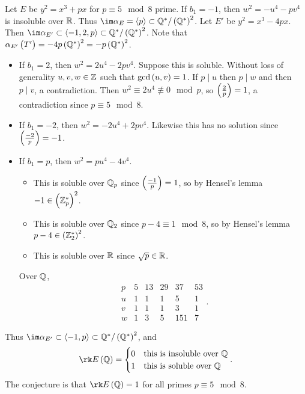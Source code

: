\begin{example*}
Let $ E $ be $ y^2 = x^3 + px $ for $ p \equiv 5 \mod 8 $ prime. If $ b_1 = -1 $, then $ w^2 = -u^4 - pv^4 $ is insoluble over $ \mathbb{R} $. Thus $ \im \alpha_E = \abr{p} \subset \QQ^* / \br{\QQ^*}^2 $. Let $ E' $ be $ y^2 = x^3 - 4px $. Then $ \im \alpha_{E'} \subset \abr{-1, 2, p} \subset \QQ^* / \br{\QQ^*}^2 $. Note that $ \alpha_{E'}\br{T'} = -4p\br{\QQ^*}^2 = -p\br{\QQ^*}^2 $.
\begin{itemize}
\item If $ b_1 = 2 $, then $ w^2 = 2u^4 - 2pv^4 $. Suppose this is soluble. Without loss of generality $ u, v, w \in \mathbb{Z} $ such that $ \gcd\br{u, v} = 1 $. If $ p \mid u $ then $ p \mid w $ and then $ p \mid v $, a contradiction. Then $ w^2 \equiv 2u^4 \not\equiv 0 \mod p $, so $ \br{\tfrac{2}{p}} = 1 $, a contradiction since $ p \equiv 5 \mod 8 $.
\item If $ b_1 = -2 $, then $ w^2 = -2u^4 + 2pv^4 $. Likewise this has no solution since $ \br{\tfrac{-2}{p}} = -1 $.
\item If $ b_1 = p $, then $ w^2 = pu^4 - 4v^4 $.
\begin{itemize}
\item This is soluble over $ \mathbb{Q}_p $ since $ \br{\tfrac{-1}{p}} = 1 $, so by Hensel's lemma $ -1 \in \br{\ZZ_p^*}^2 $.
\item This is soluble over $ \mathbb{Q}_2 $ since $ p - 4 \equiv 1 \mod 8 $, so by Hensel's lemma $ p - 4 \in \br{\ZZ_2^*}^2 $.
\item This is soluble over $ \mathbb{R} $ since $ \sqrt{p} \in \mathbb{R} $.
\end{itemize}
Over $ \mathbb{Q} $,
$$
\begin{array}{c|ccccc}
p & 5 & 13 & 29 & 37 & 53 \\
\hline
u & 1 & 1 & 1 & 5 & 1 \\
v & 1 & 1 & 1 & 3 & 1 \\
w & 1 & 3 & 5 & 151 & 7
\end{array}.
$$
\end{itemize}
Thus $ \im \alpha_{E'} \subset \abr{-1, p} \subset \QQ^* / \br{\QQ^*}^2 $, and
$$ \rk E\br{\QQ} =
\begin{cases}
0 & \text{this is insoluble over} \ \QQ \\
1 & \text{this is soluble over} \ \QQ
\end{cases}.
$$
The conjecture is that $ \rk E\br{\QQ} = 1 $ for all primes $ p \equiv 5 \mod 8 $.
\end{example*}

